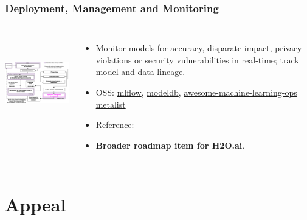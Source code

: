 \documentclass[11pt,
               aspectratio=169,
               hyperref={colorlinks}
               ]{beamer}
\begin{document}
		\begin{frame}

			\frametitle{Deployment, Management and Monitoring}		
			
			\begin{columns}
	
				\centering
				\includegraphics[height=120pt]{img/deploy.png}
				
				\vspace{-5pt}
				\begin{itemize}
					\item Monitor models for accuracy, disparate impact, privacy violations or security vulnerabilities in real-time; track model and data lineage.
					\item OSS: \href{https://github.com/mlflow/mlflow}{mlflow}, \href{https://github.com/mitdbg/modeldb}{modeldb}, \href{https://github.com/EthicalML/awesome-machine-learning-operations}{awesome-machine-learning-ops metalist}
					\item Reference: 
					\item \textbf{Broader roadmap item for H2O.ai}.
				\end{itemize}
				
			\end{columns}
		
		\end{frame}

	\section{Appeal}
\end{document}
